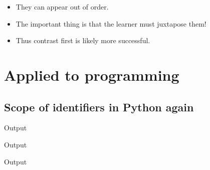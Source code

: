\begin{frame}
  \begin{remark}
    \begin{itemize}
      \item They can appear out of order.
      \item The important thing is that the learner must juxtapose them!
      \item Thus contrast first is likely more successful.
    \end{itemize}
  \end{remark}
\end{frame}

\section{Applied to programming}

\subsection{Scope of identifiers in Python again}

\begin{frame}[fragile]
  \begin{example}
  \end{example}

  \begin{block}{Output}
  \end{block}
\end{frame}

\begin{frame}[fragile]
  \begin{example}
  \end{example}

  \begin{block}{Output}
  \end{block}
\end{frame}

\begin{frame}[fragile]
  \begin{example}
  \end{example}

  \begin{block}{Output}
  \end{block}
\end{frame}

